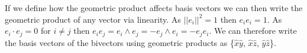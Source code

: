 \documentclass[options]{report}
\def \xhat{\hat{x}}
\def \yhat{\hat{y}}
\def \zhat{\hat{z}}
\begin{document}
If we define how the geometric product affects basis vectors we can then write the geometric product of any vector via linearity. As $||e_i||^2 = 1$ then $e_i e_i = 1$. As $e_i \cdot e_j = 0$ for $i \ne j$ then $e_i e_j = e_i \wedge e_j = -e_j \wedge e_i = - e_j e_i$. We can therefore write the basis vectors of the bivectors using geometric products as \{$\xhat\yhat$, $\xhat\zhat$, $\yhat\zhat$\}.
\end{document}
